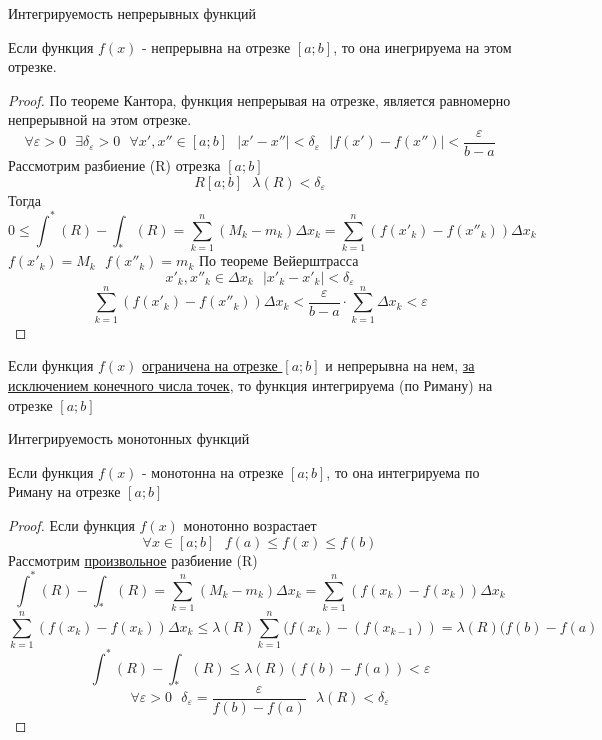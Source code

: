 \begin{title}
  Интегрируемость непрерывных функций
\end{title}

\begin{theorem}[1]
  Если функция $f(x)$ - непрерывна на отрезке $[a; b]$, то она инегрируема на
  этом отрезке.
\end{theorem}

\begin{proof}
  По теореме Кантора, функция непрерывая на отрезке, является равномерно
  непрерывной на этом отрезке.
  \[\forall \varepsilon > 0 ~~~ \exists \delta_\varepsilon > 0 ~~~ \forall
    x', x'' \in [a; b] ~~~ |x' - x''| < \delta_\varepsilon ~~~
    |f(x') - f(x'')| < \frac{\varepsilon}{b - a}\]
  Рассмотрим разбиение (R) отрезка $[a; b]$
  \[R [a; b] ~~~ \lambda (R) < \delta_\varepsilon\]
  Тогда
  \[0 \le \int^* (R) - \int_* (R) = \sum_{k = 1}^{n} (M_k - m_k)
    \Delta x_k = \sum_{k = 1}^{n} (f(x'_k) - f(x''_k))
    \Delta x_k\]
  $f(x'_k) = M_k ~~~ f(x''_k) = m_k$
  По теореме Вейерштрасса
  \[x'_k, x''_k \in \Delta x_k ~~~ |x'_k - x'_k| < \delta_\varepsilon\]
  \[\sum_{k = 1}^{n} (f(x'_k) - f(x''_k)) \Delta x_k <
    \frac{\varepsilon}{b - a} \cdot \sum_{k = 1}^{n} \Delta x_k <
    \varepsilon\]
\end{proof}

\begin{theorem}[2]
  Если функция $f(x)$ \underline{ограничена на отрезке $[a; b]$} и непрерывна
  на нем, \underline{за исключением конечного числа точек}, то функция
  интегрируема (по Риману) на отрезке $[a; b]$
\end{theorem}

\begin{title}
  Интегрируемость монотонных функций
\end{title}

\begin{theorem}
  Если функция $f(x)$ - монотонна на отрезке $[a; b]$, то она интегрируема по
  Риману на отрезке $[a; b]$
\end{theorem}

\begin{proof}
  Если функция $f(x)$ монотонно возрастает
  \[\forall x \in [a; b] ~~~ f(a) \le f(x) \le f(b)\]
  Рассмотрим \underline{произвольное} разбиение (R)
  \[\int^* (R) - \int_* (R) = \sum_{k = 1}^{n} (M_k - m_k) \Delta x_k
    = \sum_{k = 1}^{n} (f(x_k) - f(x_k)) \Delta x_k\]
  \[\sum_{k = 1}^{n} (f(x_k) - f(x_k)) \Delta x_k \le \lambda(R)
    \sum_{k = 1}^{n} (f(x_k) - (f(x_{k - 1})) = \lambda (R) (f(b) - f(a)\]
  \[\int^* (R) - \int_* (R) \le \lambda (R) (f(b) - f(a)) < \varepsilon\]
  \[\forall \varepsilon > 0 ~~~ \delta_\varepsilon = \frac{\varepsilon}{f(b) -
    f(a)} ~~~ \lambda (R) < \delta_\varepsilon\]
\end{proof}